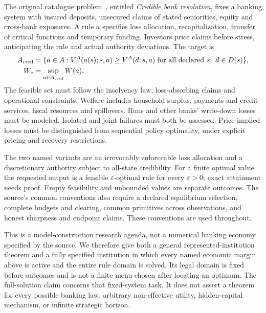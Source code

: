\documentclass[11pt,a4paper]{article}
\numberwithin{equation}{section}
\theoremstyle{definition}
\begin{document}
The original catalogue problem~\cite{catalogue}, entitled \emph{Credible
bank resolution}, fixes a banking system with insured deposits, unsecured
claims of stated seniorities, equity and cross-bank exposures. A rule
\(a\) specifies loss allocation, recapitalization, transfer of critical
functions and temporary funding. Investors price claims before stress,
anticipating the rule and actual authority deviations. The target is
\begin{equation}\label{eq:original}
\begin{split}
A_{\rm cred}
 &=\{a\in A:V^A(a(s);s,a)\ge V^A(d;s,a)
                \text{ for all declared }s,\ d\in D(s)\},\\
W_*&=\sup_{a\in A_{\rm cred}}W(a).
\end{split}
\end{equation}
The feasible set must follow the insolvency law, loss-absorbing claims and
operational constraints. Welfare includes household surplus, payments and
credit services, fiscal resources and spillovers. Runs and other banks'
write-down losses must be modeled. Isolated and joint failures must both
be assessed. Price-implied losses must be distinguished from sequential
policy optimality, under explicit pricing and recovery restrictions.

The two named variants are an irrevocably enforceable loss allocation and
a discretionary authority subject to all-state credibility. For a finite
optimal value the requested output is a feasible \(\varepsilon\)-optimal
rule for every \(\varepsilon>0\); exact attainment needs proof. Empty
feasibility and unbounded values are separate outcomes. The source's common
conventions also require a declared equilibrium selection, complete budgets
and clearing, common primitives across observations, and honest sharpness
and endpoint claims. These conventions are used throughout.

This is a model-construction research agenda, not a numerical banking
economy specified by the source. We therefore give both a general
represented-institution theorem and a fully specified institution in which
every named economic margin above is active and the entire rule domain is
solved. Its legal domain is fixed before outcomes and is not a finite menu
chosen after locating an optimum. The full-solution claim concerns that
fixed-system task. It does not assert a theorem for every possible banking
law, arbitrary non-effective utility, hidden-capital mechanism, or infinite
strategic horizon.
\end{document}
